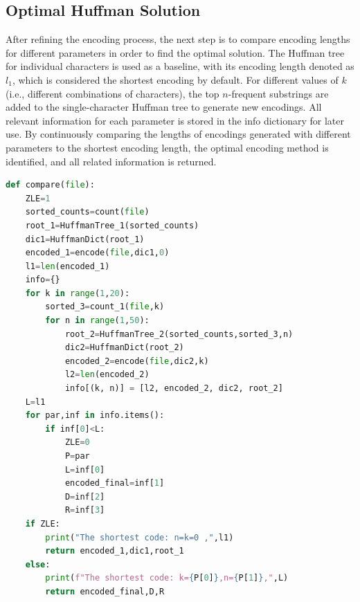 \documentclass[12pt]{article}
\begin{document}
\subsection{Optimal Huffman Solution}
After refining the encoding process, the next step is to compare encoding lengths for different parameters in order to find the optimal solution. The Huffman tree for individual characters is used as a baseline, with its encoding length denoted as \( l_1 \), which is considered the shortest encoding by default. For different values of \( k \) (i.e., different combinations of characters), the top \( n \)-frequent substrings are added to the single-character Huffman tree to generate new encodings. All relevant information for each parameter is stored in the info dictionary for later use. By continuously comparing the lengths of encodings generated with different parameters to the shortest encoding length, the optimal encoding method is identified, and all related information is returned.
\begin{tcolorbox}[colframe=black, colback=white, boxrule=0.4mm, sharp corners=southwest, title=Optimal Solution Code]
    \begin{lstlisting}[language=Python, breaklines=true]
def compare(file):
    ZLE=1   
    sorted_counts=count(file)
    root_1=HuffmanTree_1(sorted_counts)
    dic1=HuffmanDict(root_1)
    encoded_1=encode(file,dic1,0)
    l1=len(encoded_1)
    info={}
    for k in range(1,20):
        sorted_3=count_1(file,k)
        for n in range(1,50):
            root_2=HuffmanTree_2(sorted_counts,sorted_3,n)
            dic2=HuffmanDict(root_2)
            encoded_2=encode(file,dic2,k)
            l2=len(encoded_2)
            info[(k, n)] = [l2, encoded_2, dic2, root_2]
    L=l1
    for par,inf in info.items():
        if inf[0]<L:
            ZLE=0
            P=par
            L=inf[0]
            encoded_final=inf[1]
            D=inf[2]
            R=inf[3]
    if ZLE:
        print("The shortest code: n=k=0 ,",l1)
        return encoded_1,dic1,root_1
    else:
        print(f"The shortest code: k={P[0]},n={P[1]},",L)
        return encoded_final,D,R
\end{lstlisting}
\end{tcolorbox}
\end{document}
